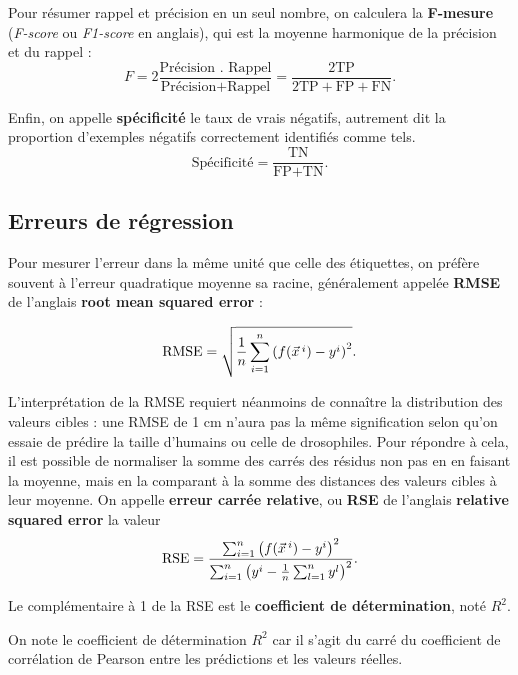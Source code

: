 Pour résumer rappel et précision en un seul nombre, on calculera la
\textbf{F-mesure} (\textit{F-score} ou \textit{F1-score} en anglais), qui est
la moyenne harmonique de la précision et du rappel :
\begin{equation*}
  F = 2 \frac{\text{Précision . Rappel}}{\text{Précision} + \text{Rappel}} = 
  \frac{2 \text{TP}}{2 \text{TP} + \text{FP} + \text{FN}}.
\end{equation*}

Enfin, on appelle \textbf{spécificité} le taux de vrais négatifs, autrement dit la
proportion d'exemples négatifs correctement identifiés comme tels.
\begin{equation*}
  \text{Spécificité} = \frac{\text{TN}}{\text{FP} + \text{TN}}.
\end{equation*}

\subsection{Erreurs de régression}
\label{sec:regression_errors}
Pour mesurer l'erreur dans la même unité que celle des étiquettes, on préfère
souvent à l'erreur quadratique moyenne sa racine, généralement appelée
\textbf{RMSE} de l'anglais \textbf{root mean squared error} :

\begin{equation*}
  \text{RMSE} = \sqrt{\frac1n \sum_{i=1}^n \left( f(\xx^i) - y^i \right)^2}.
\end{equation*}

L'interprétation de la RMSE requiert néanmoins de connaître la distribution
des valeurs cibles : une RMSE de 1 cm n'aura pas la même signification selon
qu'on essaie de prédire la taille d'humains ou celle de drosophiles.  Pour
répondre à cela, il est possible de normaliser la somme des carrés des résidus
non pas en en faisant la moyenne, mais en la comparant à la somme des distances
des valeurs cibles à leur moyenne.  On appelle \textbf{erreur carrée relative},
ou \textbf{RSE} de l'anglais \textbf{relative squared error} la valeur
\begin{equation*}
  \text{RSE} = \frac{ \sum_{i=1}^n \left( f(\xx^i) - y^i \right)^2}{
    \sum_{i=1}^n \left( y^i - \frac1n \sum_{l=1}^n y^l \right)^2}.
\end{equation*}

Le complémentaire à 1 de la RSE est le \textbf{coefficient de détermination}, noté
$R^2$.

On note le coefficient de détermination $R^2$ car il s'agit du carré du
coefficient de corrélation de Pearson entre les prédictions et les valeurs réelles. 





